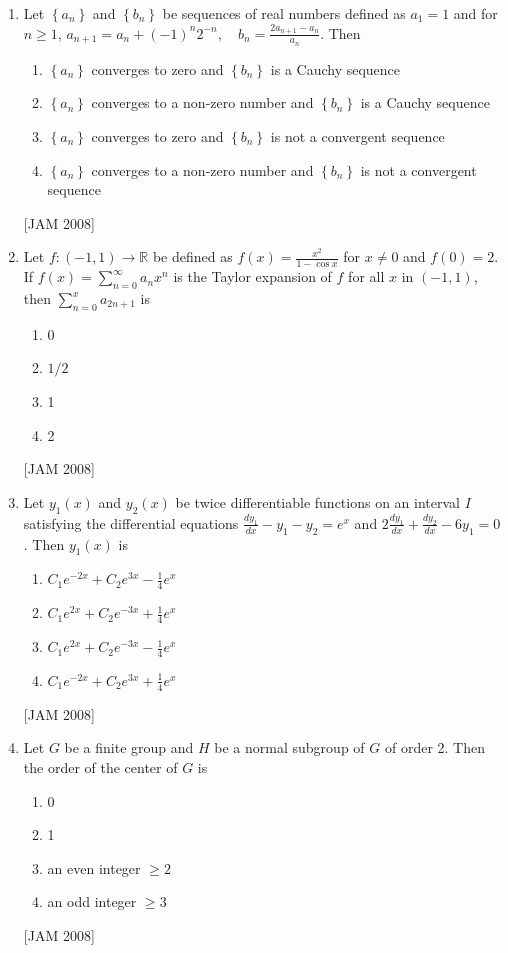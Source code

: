 \begin{enumerate}
\item  Let $\left\{a_{n}\right\}$ and $\left\{b_{n}\right\}$ be sequences of real numbers defined as $a_{1}=1$ and for $n \geq 1$, $a_{n+1}=a_{n}+(-1)^{n} 2^{-n}, \quad b_{n}=\frac{2 a_{n+1}-a_{n}}{a_{n}}$. Then 
\begin{enumerate}
\item $\left\{a_{n}\right\}$ converges to zero and $\left\{b_{n}\right\}$ is a Cauchy sequence 
\item $\left\{a_{n}\right\}$ converges to a non-zero number and $\left\{b_{n}\right\}$ is a Cauchy sequence 
\item $\left\{a_{n}\right\}$ converges to zero and $\left\{b_{n}\right\}$ is not a convergent sequence 
\item $\left\{a_{n}\right\}$ converges to a non-zero number and $\left\{b_{n}\right\}$ is not a convergent sequence
\end{enumerate}
 \hfill [JAM 2008]


\item  Let $f:(-1,1) \rightarrow \mathbb{R}$ be defined as $f(x)=\frac{x^{2}}{1-\cos x}$ for $x \neq 0$ and $f(0)=2$. If $f(x)=\sum_{n=0}^{\infty} a_{n} x^{n}$ is the Taylor expansion of $f$ for all $x$ in $(-1,1)$, then $\sum_{n=0}^{x} a_{2 n+1}$ is 
\begin{enumerate}
\item 0 
\item $1 / 2$ 
\item 1 
\item 2
\end{enumerate}
 \hfill [JAM 2008]


\item  Let $y_{1}(x)$ and $y_{2}(x)$ be twice differentiable functions on an interval $I$ satisfying the differential equations $\frac{d y_{1}}{d x}-y_{1}-y_{2}=e^{x}$ and $2 \frac{d y_{1}}{d x}+\frac{d y_{2}}{d x}-6 y_{1}=0$. Then $y_{1}(x)$ is 
\begin{enumerate}
\item $C_{1} e^{-2 x}+C_{2} e^{3 x}-\frac{1}{4} e^{x}$ 
\item $C_{1} e^{2 x}+C_{2} e^{-3 x}+\frac{1}{4} e^{x}$ 
\item $C_{1} e^{2 x}+C_{2} e^{-3 x}-\frac{1}{4} e^{x}$ 
\item $C_{1} e^{-2 x}+C_{2} e^{3 x}+\frac{1}{4} e^{x}$
\end{enumerate}
 \hfill [JAM 2008]


\item  Let $G$ be a finite group and $H$ be a normal subgroup of $G$ of order 2. Then the order of the center of $G$ is 
\begin{enumerate}
\item 0 
\item 1 
\item an even integer $\geq 2$ 
\item an odd integer $\geq 3$
\end{enumerate}
 \hfill [JAM 2008]





\end{enumerate}
